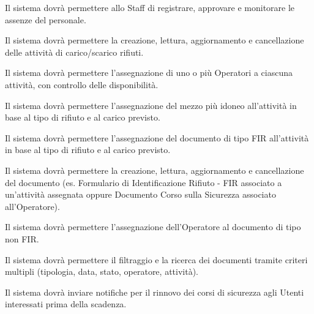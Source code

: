 \documentclass[a4paper]{report}
\begin{document}


Il sistema dovrà permettere allo Staff di registrare, approvare e monitorare le assenze del personale.



Il sistema dovrà permettere la creazione, lettura, aggiornamento e cancellazione delle attività di carico/scarico rifiuti.


Il sistema dovrà permettere l'assegnazione di uno o più Operatori a ciascuna attività, con controllo delle disponibilità.


Il sistema dovrà permettere l'assegnazione del mezzo più idoneo all'attività in base al tipo di rifiuto e al carico previsto.


Il sistema dovrà permettere l'assegnazione del documento di tipo FIR all'attività in base al tipo di rifiuto e al carico previsto.



Il sistema dovrà permettere la creazione, lettura, aggiornamento e cancellazione del documento (es. Formulario di Identificazione Rifiuto - FIR associato a un'attività assegnata oppure Documento Corso sulla Sicurezza associato all'Operatore).


Il sistema dovrà permettere l’assegnazione dell’Operatore al documento di tipo non FIR. 


Il sistema dovrà permettere il filtraggio e la ricerca dei documenti tramite criteri multipli (tipologia, data, stato, operatore, attività).


Il sistema dovrà inviare notifiche per il rinnovo dei corsi di sicurezza agli Utenti interessati prima della scadenza.

\end{document}

